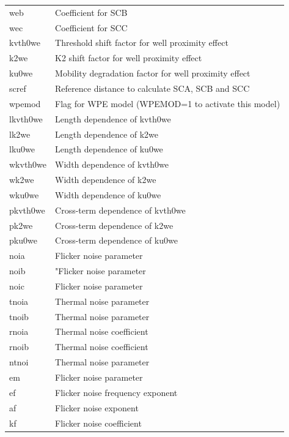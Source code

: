 \begin{longtable}{l l}
{\small web} & {\small Coefficient for SCB} \\
{\small wec} & {\small Coefficient for SCC} \\
{\small kvth0we} & {\small Threshold shift factor for well proximity effect} \\
{\small k2we} & {\small K2 shift factor for well proximity effect } \\
{\small ku0we} & {\small Mobility degradation factor for well proximity effect } \\
{\small scref} & {\small Reference distance to calculate SCA, SCB and SCC} \\
{\small wpemod} & {\small Flag for WPE model (WPEMOD=1 to activate this model) } \\
{\small lkvth0we} & {\small Length dependence of kvth0we} \\
{\small lk2we} & {\small Length dependence of k2we } \\
{\small lku0we} & {\small Length dependence of ku0we } \\
{\small wkvth0we} & {\small Width dependence of kvth0we} \\
{\small wk2we} & {\small Width dependence of k2we } \\
{\small wku0we} & {\small Width dependence of ku0we } \\
{\small pkvth0we} & {\small Cross-term dependence of kvth0we} \\
{\small pk2we} & {\small Cross-term dependence of k2we } \\
{\small pku0we} & {\small Cross-term dependence of ku0we } \\

{\small noia} & {\small Flicker noise parameter} \\
{\small noib} & {\small "Flicker noise parameter} \\
{\small noic} & {\small Flicker noise parameter} \\
{\small tnoia} & {\small Thermal noise parameter} \\
{\small tnoib} & {\small Thermal noise parameter} \\
{\small rnoia} & {\small Thermal noise coefficient} \\
{\small rnoib} & {\small Thermal noise coefficient} \\
{\small ntnoi} & {\small Thermal noise parameter} \\
{\small em} & {\small Flicker noise parameter} \\
{\small ef} & {\small Flicker noise frequency exponent} \\
{\small af} & {\small Flicker noise exponent} \\
{\small kf} & {\small Flicker noise coefficient} \\

\end{longtable}																				


